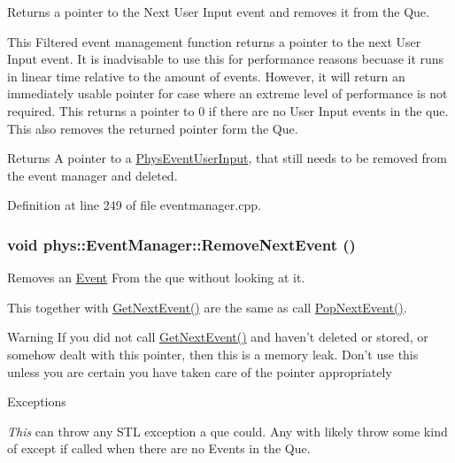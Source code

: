 Returns a pointer to the Next User Input event and removes it from the Que. 

This Filtered event management function returns a pointer to the next User Input event. It is inadvisable to use this for performance reasons becuase it runs in linear time relative to the amount of events. However, it will return an immediately usable pointer for case where an extreme level of performance is not required. This returns a pointer to 0 if there are no User Input events in the que. This also removes the returned pointer form the Que. \begin{DoxyReturn}{Returns}
A pointer to a \hyperlink{classPhysEventUserInput}{PhysEventUserInput}, that still needs to be removed from the event manager and deleted. 
\end{DoxyReturn}


Definition at line 249 of file eventmanager.cpp.

\hypertarget{classphys_1_1EventManager_a2389a44d199f121e1fea741f83248513}{
\subsubsection[{RemoveNextEvent}]{\setlength{\rightskip}{0pt plus 5cm}void phys::EventManager::RemoveNextEvent ()}}
\label{da/dde/classphys_1_1EventManager_a2389a44d199f121e1fea741f83248513}


Removes an \hyperlink{classphys_1_1Event}{Event} From the que without looking at it. 

This together with \hyperlink{classphys_1_1EventManager_a4c11830094d6566fd5db87dfbe6b5dd0}{GetNextEvent()} are the same as call \hyperlink{classphys_1_1EventManager_ac4f0c084cadd712233914c96fffdb2d5}{PopNextEvent()}. \begin{DoxyWarning}{Warning}
If you did not call \hyperlink{classphys_1_1EventManager_a4c11830094d6566fd5db87dfbe6b5dd0}{GetNextEvent()} and haven't deleted or stored, or somehow dealt with this pointer, then this is a memory leak. Don't use this unless you are certain you have taken care of the pointer appropriately 
\end{DoxyWarning}

\begin{DoxyExceptions}{Exceptions}
\item[{\em This}]can throw any STL exception a que could. Any with likely throw some kind of except if called when there are no Events in the Que. \end{DoxyExceptions}


